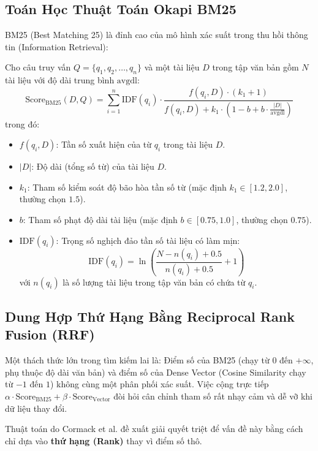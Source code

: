 \subsection{Toán Học Thuật Toán Okapi BM25}
BM25 (Best Matching 25) là đỉnh cao của mô hình xác suất trong thu hồi thông tin (Information Retrieval):
\begin{definition}
Cho câu truy vấn $Q = \{q_1, q_2, \dots, q_n\}$ và một tài liệu $D$ trong tập văn bản gồm $N$ tài liệu với độ dài trung bình $\text{avgdl}$:
\begin{equation}
\text{Score}_{\text{BM25}}(D, Q) = \sum_{i=1}^n \text{IDF}(q_i) \cdot \frac{f(q_i, D) \cdot (k_1 + 1)}{f(q_i, D) + k_1 \cdot \left(1 - b + b \cdot \frac{|D|}{\text{avgdl}}\right)}
\end{equation}
trong đó:
\begin{itemize}
  \item $f(q_i, D)$: Tần số xuất hiện của từ $q_i$ trong tài liệu $D$.
  \item $|D|$: Độ dài (tổng số từ) của tài liệu $D$.
  \item $k_1$: Tham số kiểm soát độ bão hòa tần số từ (mặc định $k_1 \in [1.2, 2.0]$, thường chọn $1.5$).
  \item $b$: Tham số phạt độ dài tài liệu (mặc định $b \in [0.75, 1.0]$, thường chọn $0.75$).
  \item $\text{IDF}(q_i)$: Trọng số nghịch đảo tần số tài liệu có làm mịn:
  \begin{equation}
  \text{IDF}(q_i) = \ln \left( \frac{N - n(q_i) + 0.5}{n(q_i) + 0.5} + 1 \right)
  \end{equation}
  với $n(q_i)$ là số lượng tài liệu trong tập văn bản có chứa từ $q_i$.
\end{itemize}
\end{definition}

\subsection{Dung Hợp Thứ Hạng Bằng Reciprocal Rank Fusion (RRF)}
Một thách thức lớn trong tìm kiếm lai là: Điểm số của BM25 (chạy từ $0$ đến $+\infty$, phụ thuộc độ dài văn bản) và điểm số của Dense Vector (Cosine Similarity chạy từ $-1$ đến $1$) không cùng một phân phối xác suất. Việc cộng trực tiếp $\alpha \cdot \text{Score}_{\text{BM25}} + \beta \cdot \text{Score}_{\text{Vector}}$ đòi hỏi cân chỉnh tham số rất nhạy cảm và dễ vỡ khi dữ liệu thay đổi.

Thuật toán  do Cormack et al. đề xuất giải quyết triệt để vấn đề này bằng cách chỉ dựa vào \textbf{thứ hạng (Rank)} thay vì điểm số thô.

